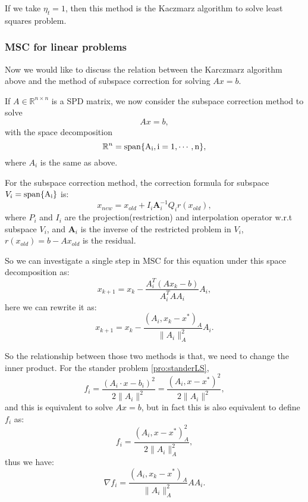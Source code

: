 If we take $\eta_t = 1$, then this method is the Kaczmarz algorithm to solve least squares problem. 

\subsubsection{MSC for linear problems}
Now we would like to discuss the relation between the Karczmarz
algorithm above and the method of subspace correction for solving $Ax
= b$.

If $A \in \mathbb{R}^{n \times n}$ is a SPD matrix,  we now consider the subspace correction method to solve 
\begin{equation}\label{equ:SPD}
Ax = b,
\end{equation}
with the space decomposition 
\begin{equation}
\mathbb{R}^n = \rm{span}\{A_i, i = 1, \cdots, n\},
\end{equation}
where $A_i$ is the same as above. 

For the subspace correction method, the correction formula for subspace $V_i = \rm{span}\{A_i\}$ is:
\begin{equation}
x_{new} = x_{old} + I_i \bm{A}_i^{-1} Q_i r(x_{old}),
\end{equation}
where $P_i$ and $I_i$ are the projection(restriction) and interpolation operator w.r.t subspace $V_i$, and $\bm{A}_i$ is the inverse of the restricted problem in $V_i$, $r(x_{old}) = b - Ax_{old}$ is the residual. 

So we can investigate a single step in MSC for this equation under this space decomposition as:
\begin{equation}
x_{k+1} = x_k - \frac{A_i^T(Ax_k - b)}{A_i^T A A_i}A_i,
\end{equation}
here we can rewrite it as:
\begin{equation}\label{equ:MSC}
x_{k+1} = x_k - \frac{(A_i, x_k - x^*)_A}{\|A_i\|^2_A}A_i.
\end{equation}

So the relationship between those two methods is that, we need to change the inner product. For the stander problem \ref{pro:standerLS}, 
\begin{equation}
f_i = \frac{(A_i \cdot x - b_i)^2}{2\|A_i\|^2} = \frac{(A_i, x - x^*)^2}{2\|A_i\|^2},
\end{equation}
and this is equivalent to solve $Ax = b$, but in fact this is also equivalent to define $f_i$ as:
\begin{equation}\label{equ:newinnerpro}
f_i = \frac{(A_i, x - x^*)_A^2}{2\|A_i\|_A^2},
\end{equation}
thus we have:
\begin{equation}
\nabla f_i = \frac{(A_i, x_k - x^*)_A}{\|A_i\|^2_A} A A_i.
\end{equation}

